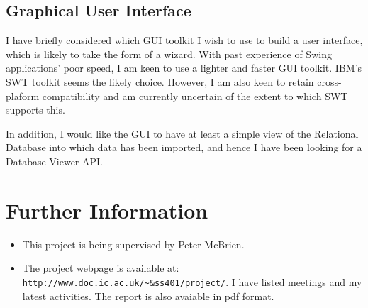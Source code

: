 \documentclass[a4paper]{article}
\begin{document}
\subsection{Graphical User Interface}

I have briefly considered which GUI toolkit I wish to use to build a user interface, which is likely to take the form of a wizard. With past experience of Swing applications' poor speed, I am keen to use a lighter and faster GUI toolkit. IBM's SWT toolkit seems the likely choice. However, I am also keen to retain cross-plaform compatibility and am currently uncertain of the extent to which SWT supports this.

In addition, I would like the GUI to have at least a simple view of the Relational Database into which data has been imported, and hence I have been looking for a Database Viewer API.

\section{Further Information}

\begin{itemize}
\item This project is being supervised by Peter McBrien. 
\item The project webpage is available at: {\tt http://www.doc.ic.ac.uk/\~&ss401/project/}. I have listed meetings and my latest activities. The report is also avaiable in pdf format.
\end{itemize}

%
\end{document}
